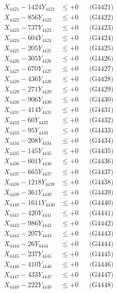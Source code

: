 \documentclass[a4paper,10pt]{article}
\begin{document}
{\begin{align}
\allowbreak
X_{4421} - 1424Y_{4421} &\leq +0 && \text{(G4421)} \\
X_{4422} - 856Y_{4422} &\leq +0 && \text{(G4422)} \\
X_{4423} - 737Y_{4423} &\leq +0 && \text{(G4423)} \\
X_{4424} - 604Y_{4424} &\leq +0 && \text{(G4424)} \\
X_{4425} - 205Y_{4425} &\leq +0 && \text{(G4425)} \\
X_{4426} - 305Y_{4426} &\leq +0 && \text{(G4426)} \\
X_{4427} - 670Y_{4427} &\leq +0 && \text{(G4427)} \\
X_{4428} - 436Y_{4428} &\leq +0 && \text{(G4428)} \\
X_{4429} - 271Y_{4429} &\leq +0 && \text{(G4429)} \\
X_{4430} - 906Y_{4430} &\leq +0 && \text{(G4430)} \\
\allowbreak
X_{4431} - 414Y_{4431} &\leq +0 && \text{(G4431)} \\
X_{4432} - 60Y_{4432} &\leq +0 && \text{(G4432)} \\
X_{4433} - 95Y_{4433} &\leq +0 && \text{(G4433)} \\
X_{4434} - 208Y_{4434} &\leq +0 && \text{(G4434)} \\
X_{4435} - 145Y_{4435} &\leq +0 && \text{(G4435)} \\
X_{4436} - 601Y_{4436} &\leq +0 && \text{(G4436)} \\
X_{4437} - 665Y_{4437} &\leq +0 && \text{(G4437)} \\
X_{4438} - 1218Y_{4438} &\leq +0 && \text{(G4438)} \\
X_{4439} - 361Y_{4439} &\leq +0 && \text{(G4439)} \\
X_{4440} - 1611Y_{4440} &\leq +0 && \text{(G4440)} \\
\allowbreak
X_{4441} - 420Y_{4441} &\leq +0 && \text{(G4441)} \\
X_{4442} - 986Y_{4442} &\leq +0 && \text{(G4442)} \\
X_{4443} - 207Y_{4443} &\leq +0 && \text{(G4443)} \\
X_{4444} - 26Y_{4444} &\leq +0 && \text{(G4444)} \\
X_{4445} - 237Y_{4445} &\leq +0 && \text{(G4445)} \\
X_{4446} - 410Y_{4446} &\leq +0 && \text{(G4446)} \\
X_{4447} - 433Y_{4447} &\leq +0 && \text{(G4447)} \\
X_{4448} - 222Y_{4448} &\leq +0 && \text{(G4448)} \\

\end{align}}
\end{document}
